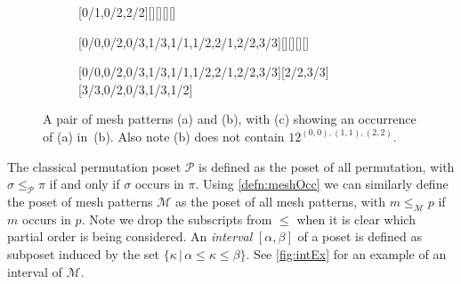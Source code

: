 \documentclass[11pt,a4paper,oneside]{article}
\begin{document}
\begin{figure}\centering
\begin{subfigure}[b]{0.3\textwidth}
\centering{}[0/1,0/2,2/2][][][][]
\caption{}\label{subfiga}\end{subfigure}
\begin{subfigure}[b]{0.3\textwidth}
\centering{}[0/0,0/2,0/3,1/3,1/1,1/2,2/1,2/2,3/3][][][][]
\caption{}\label{subfigb}\end{subfigure}
\begin{subfigure}[b]{0.3\textwidth}\centering
{}[0/0,0/2,0/3,1/3,1/1,1/2,2/1,2/2,3/3][2/2,3/3][3/3,0/2,0/3,1/3,1/2]
\caption{}\label{subfigc}\end{subfigure}
\caption{A pair of mesh patterns (a) and (b), with (c) showing an occurrence of (a) in~(b).
 Also note (b) does not contain $12^{(0,0),(1,1),(2,2)}$.}\label{fig:occEx}
\end{figure}

The classical permutation poset $\mathcal{P}$ is defined as the poset of all permutation,
with $\sigma\le_\mathcal{P}\pi$ if and only if $\sigma$ occurs in $\pi$. Using \cref{defn:meshOcc}
we can similarly define the poset of mesh patterns $\mathcal{M}$ as the poset of all mesh patterns,
with $m\le_\mathcal{M} p$ if $m$ occurs in $p$. Note we drop the subscripts from $\le$ when it is clear
which partial order is being considered. An \emph{interval} $[\alpha,\beta]$ of a poset is defined as subposet induced by the set
$\{\kappa\,|\,\alpha\le\kappa\le\beta\}$. See \cref{fig:intEx} for an example of an interval of $\mathcal{M}$.
\end{document}
